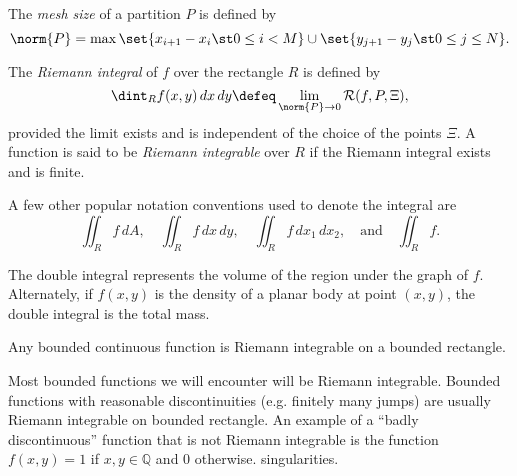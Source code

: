   \begin{definition}
    The \emph{mesh size} of a partition $P$ is defined by
    \begin{equation*}
      \norm{P} = \max \set{ x_{i+1} - x_i \st 0 \leq i < M} \cup \set{y_{j+1} - y_j \st 0 \leq j \leq N }.
    \end{equation*}
  \end{definition}

  \begin{definition}
    The \emph{Riemann integral} of $f$ over the rectangle $R$ is defined by
    \begin{equation*}
      \dint_R f(x, y) \, dx \, dy
      \defeq
      \lim_{\norm{P} \to 0}
	\mathcal R( f, P, \Xi ),
    \end{equation*}
    provided the limit exists and is independent of the choice of the points 
$\Xi$.
    A function is said to be \emph{Riemann integrable} over $R$ if the Riemann 
integral exists and is finite.
  \end{definition}

  \begin{remark}
    A few other popular notation conventions used to denote the integral are
    \begin{equation*}
      \iint_R f \, dA,
      \quad
      \iint_R f \, dx \, dy,
      \quad
      \iint_R f \, dx_1 \, dx_2,
      \quad\text{and}\quad
      \iint_R f.
    \end{equation*}
  \end{remark}

  \begin{remark}
    The double integral represents the volume of the region under the graph of 
$f$.
    Alternately, if $f(x, y)$ is the density of a planar body at point $(x, y)$, 
the double integral is the total mass.
  \end{remark}

  \begin{theorem}
    Any bounded continuous function is Riemann integrable on a bounded 
rectangle.
  \end{theorem}

  \begin{remark}
    Most bounded functions we will encounter will be Riemann integrable.
    Bounded functions with reasonable discontinuities (e.g. finitely many jumps) 
are usually Riemann integrable on bounded rectangle.
    An example of a ``badly discontinuous'' function that is not Riemann 
integrable is the function $f(x, y) = 1$ if $x, y \in \mathbb{Q}$ and $0$ 
otherwise.
singularities.
  \end{remark}



